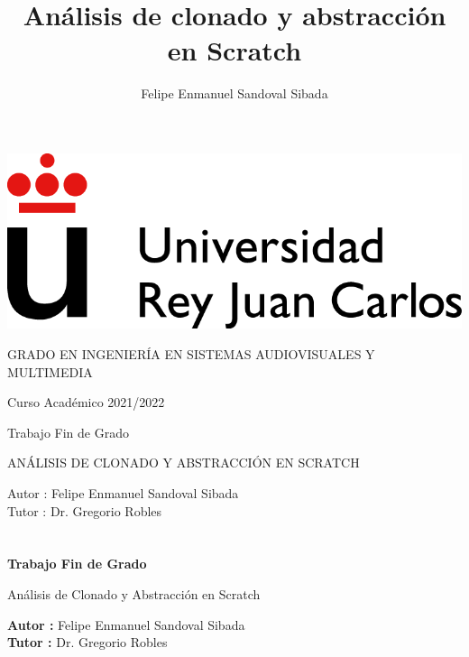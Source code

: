 \documentclass[a4paper, 12pt]{book}
\title{Análisis de clonado y abstracción en Scratch}
\author{Felipe Enmanuel Sandoval Sibada}
\begin{document}
\renewcommand{\refname}{Bibliografía}  %
\renewcommand{\appendixname}{Apéndice}


\begin{titlepage}
\begin{center}
\includegraphics[scale=0.6]{img/logo_vect.png}
\Large

\vspace{1.75cm}

\Large
GRADO EN INGENIERÍA EN SISTEMAS AUDIOVISUALES Y MULTIMEDIA

\vspace{0.4cm}

\large
Curso Académico 2021/2022

\vspace{0.8cm}

Trabajo Fin de Grado

\vspace{2.0cm}

\LARGE
ANÁLISIS DE CLONADO Y ABSTRACCIÓN EN SCRATCH

\vspace{4cm}

\large
Autor : Felipe Enmanuel Sandoval Sibada \\
Tutor : Dr. Gregorio Robles
\end{center}
\end{titlepage}

\newpage
\mbox{}
\thispagestyle{empty} %


\clearpage
{}
\chapter*{}

\vspace{-4cm}
\begin{center}
\LARGE
\textbf{Trabajo Fin de Grado}

\vspace{1cm}
\large
Análisis de Clonado y Abstracción en Scratch

\vspace{1cm}
\large
\textbf{Autor :} Felipe Enmanuel Sandoval Sibada \\
\textbf{Tutor :} Dr. Gregorio Robles

\end{center}
\end{document}
